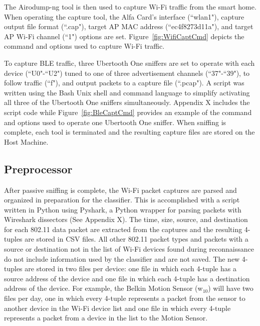 \documentclass[12pt,letterpaper,oneside]{book}
\begin{document}
			\figMonitorMode
			
			The Airodump-ng tool is then used to capture Wi-Fi traffic from the smart home. When operating the capture tool, the Alfa Card's interface (``wlan1"), capture output file format (``.cap"), target \ac{AP} \ac{MAC} address (``ec4f8273d11a"), and target \ac{AP} Wi-Fi channel (``1") options are set. Figure~\ref{fig:WifiCaptCmd} depicts the command and options used to capture Wi-Fi traffic. 
			
			\figWifiCaptCmd
			
			To capture \ac{BLE} traffic, three Ubertooth One sniffers are set to operate with each device (``U0"-``U2") tuned to one of three advertisement channels (``37"-``39"), to follow traffic (``f"), and output packets to a capture file (``.pcap"). A script was written using the Bash Unix shell and command language to simplify activating all three of the Ubertooth One sniffers simultaneously. Appendix X includes the script code while Figure~\ref{fig:BleCaptCmd} provides an example of the command and options used to operate one Ubertooth One sniffer. When sniffing is complete, each tool is terminated and the resulting capture files are stored on the Host Machine.
			
			\figBleCaptCmd
		
			\subsection{Preprocessor}
			After passive sniffing is complete, the Wi-Fi packet captures are parsed and organized in preparation for the classifier. This is accomplished with a script written in Python using Pyshark, a Python wrapper for parsing packets with Wireshark dissectors (See Appendix X). The time, size, source, and destination for each 802.11 data packet are extracted from the captures and the resulting 4-tuples are stored in \ac{CSV} files. All other 802.11 packet types and packets with a source or destination not in the list of Wi-Fi devices found during reconnaissance do not include information used by the classifier and are not saved. The new 4-tuples are stored in two files per device: one file in which each 4-tuple has a source address of the device and one file in which each 4-tuple has a destination address of the device. For example, the Belkin Motion Sensor (w$ _{10}$) will have two files per day, one in which every 4-tuple represents a packet from the sensor to another device in the Wi-Fi device list and one file in which every 4-tuple represents a packet from a device in the list to the Motion Sensor.
		
\end{document}
